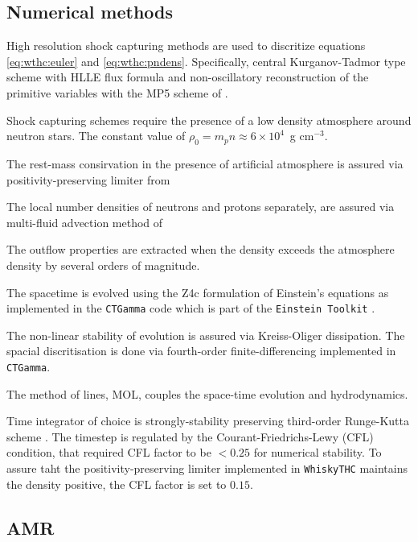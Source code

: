 \documentclass[11pt,a4paper,headinclude=true,DIV=14,BCOR=8mm,chapterprefix,listof=totoc,twoside,openright,abstracton]{scrbook}
\newcommand{\gcm}{g cm$^{-3}$}
\begin{document}
\subsection{Numerical methods}


High resolution shock capturing methods are used to discritize equations 
\eqref{eq:wthc:euler} and \eqref{eq:wthc:pndens}.
Specifically, central Kurganov-Tadmor type scheme \cite{Kurganov:2000} with 
HLLE flux formula \cite{Einfeldt:1988}
and non-oscillatory reconstruction of the primitive variables with the MP5 scheme of
\cite{Suresh:1997}.

Shock capturing schemes require the presence of a low density atmosphere around neutron stars.
The constant value of $\rho_0 = m_p n \approx 6\times 10^4$~\gcm.

The rest-mass consirvation in the presence of artificial atmosphere is assured via 
positivity-preserving limiter from \cite{Radice:2013xpa}

The local number densities of neutrons and protons separately, are assured via 
multi-fluid advection method of \cite{Plewa:1998nma}

The outflow properties are extracted when the density exceeds the atmosphere density
by several orders of magnitude.

The spacetime is evolved using the Z4c formulation of Einstein's equations
\cite{Bernuzzi:2009ex,Hilditch:2012fp} as implemented in the \texttt{CTGamma} code
\cite{Pollney:2009yz,Reisswig:2013sqa} which is part of the \texttt{Einstein Toolkit} 
\cite{Loffler:2011ay}.

The non-linear stability of evolution is assured via Kreiss-Oliger dissipation. 
The spacial discritisation is done via fourth-order finite-differencing implemented in \texttt{CTGamma}.

The method of lines, MOL, couples the space-time evolution and hydrodynamics. 

Time integrator of choice is strongly-stability preserving third-order Runge-Kutta scheme \cite{Gottlieb:2009}.
The timestep is regulated by the Courant-Friedrichs-Lewy (CFL) condition, that required CFL factor 
to be $<0.25$ for numerical stability. To assure taht the positivity-preserving limiter implemented in \texttt{WhiskyTHC} maintains the density positive, the CFL factor is set to $0.15$.


\subsection{AMR}
\end{document}
